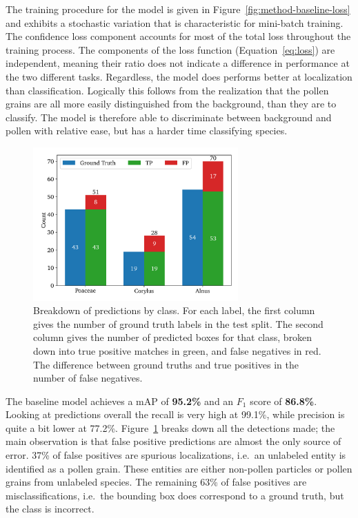 The training procedure for the model is given in Figure~\ref{fig:method-baseline-loss} and exhibits a stochastic variation that is characteristic for mini-batch training.
The confidence loss component accounts for most of the total loss throughout the training process.
The components of the loss function (Equation~\ref{eq:loss}) are independent, meaning their ratio does not indicate a difference in performance at the two different tasks.
Regardless, the model does performs better at localization than classification.
Logically this follows from the realization that the pollen grains are all more easily distinguished from the background, than they are to classify.
The model is therefore able to discriminate between background and pollen with relative ease, but has a harder time classifying species.

\begin{figure}[htbp]
    \centering
    \includegraphics[width=0.7\textwidth]{figs/results/baseline/detections_test.pdf}
    \caption[Detections by type by class for the baseline on the test split]{%
Breakdown of predictions by class.
For each label, the first column gives the number of ground truth labels in the test split.
The second column gives the number of predicted boxes for that class, broken down into true positive matches in green, and false negatives in red.
The difference between ground truths and true positives in the number of false negatives.
    }\label{fig:results-baseline-detections}
  \end{figure}

The baseline model achieves a mAP of \textbf{95.2\%} and an \(F_1\) score of \textbf{86.8\%}.
Looking at predictions overall the recall is very high at 99.1\%, while precision is quite a bit lower at 77.2\%.
Figure~\ref{fig:results-baseline-detections} breaks down all the detections made; the main observation is that false positive predictions are almost the only source of error.
37\% of false positives are spurious localizations, i.e.\ an unlabeled entity is identified as a pollen grain.
These entities are either non-pollen particles or pollen grains from unlabeled species.
The remaining 63\% of false positives are misclassifications, i.e.\ the bounding box does correspond to a ground truth, but the class is incorrect.

